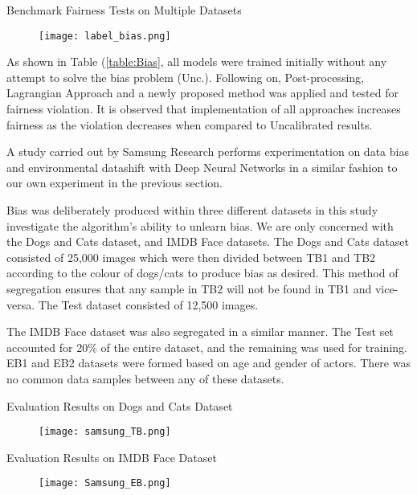 \enlargethispage{\baselineskip}
\begin{table}[H]
    \bigskip
    \caption{Benchmark Fairness Tests on Multiple Datasets \cite{Jiang}}
    \begin{figure}[H]
        \texttt{[image: label\_bias.png]}
        \centering
    \end{figure}
    \label{table:fairness}
\end{table}

As shown in Table (\ref{table:Bias}, all models were trained initially without any attempt to solve the bias problem (Unc.).
Following on, Post-processing, Lagrangian Approach and a newly proposed method was applied and tested for fairness violation.
It is observed that implementation of all approaches increases fairness as the violation decreases when compared to Uncalibrated results.

\bigskip
A study carried out by Samsung Research \cite{8953715} performs experimentation on data bias and environmental datashift with Deep Neural Networks in a similar fashion to our own experiment in the previous section.

Bias was deliberately produced within three different datasets in this study investigate the algorithm's ability to unlearn bias. 
We are only concerned with the Dogs and Cats dataset, and IMDB Face datasets.
The Dogs and Cats dataset consisted of 25,000 images which were then divided between TB1 and TB2 according to the colour of dogs/cats to produce bias as desired.
This method of segregation ensures that any sample in TB2 will not be found in TB1 and vice-versa.
The Test dataset consisted of 12,500 images. 

The IMDB Face dataset was also segregated in a similar manner.
The Test set accounted for 20\% of the entire dataset, and the remaining was used for training.
EB1 and EB2 datasets were formed based on age and gender of actors. There was no common data samples between any of these datasets.

\begin{table}[H]
    \caption{Evaluation Results on Dogs and Cats Dataset \cite{8953715}}
    \begin{figure}[H]
        \texttt{[image: samsung\_TB.png]}
        \centering
    \end{figure}
    \label{table:Dogs and Cats}
\end{table}

\begin{table}[H]
    \caption{Evaluation Results on IMDB Face Dataset \cite{8953715}}
    \begin{figure}[H]
        \texttt{[image: Samsung\_EB.png]}
        \centering
    \end{figure}
    \label{table:IMDB}
\end{table}

